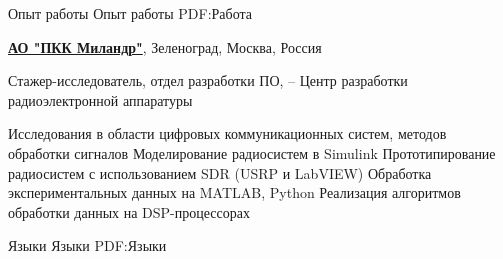 \documentclass[a4paper, MMyyyy,nonstopmode]{simpleresumecv}
\begin{document}
\begin{Body}












\Section
{Опыт работы}
{Опыт работы}
{PDF:Работа}

\Entry
\href{https://www.milandr.ru/}
{\textbf{АО "ПКК Миландр"}},
Зеленоград, Москва, Россия

\Gap
\BulletItem
Стажер-исследователь,
отдел разработки ПО,
\hfill
{} -- 
\newline
Центр разработки радиоэлектронной аппаратуры
\begin{Detail}
\SubBulletItem
Исследования в области цифровых коммуникационных систем, методов обработки сигналов
\SubBulletItem
Моделирование радиосистем в Simulink
\SubBulletItem
Прототипирование радиосистем с использованием SDR (USRP и LabVIEW)
\SubBulletItem
Обработка экспериментальных данных на MATLAB, Python
\SubBulletItem
Реализация алгоритмов обработки данных на DSP-процессорах
\end{Detail}


\Section
{Языки}
{Языки}
{PDF:Языки}


\end{Body}
\end{document}

